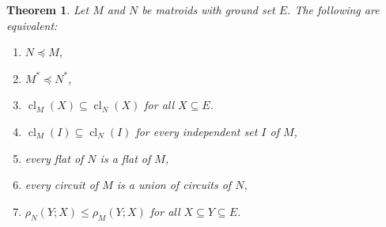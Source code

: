 \documentclass{amsart}
\theoremstyle{plain}
\newtheorem{theorem}{Theorem}[section]
\theoremstyle{definition}
\DeclareMathOperator{\cl}{cl}
\renewcommand{\le}{\leqslant}
\renewcommand{\ss}{\subseteq}
\newcommand{\relrank}[3]{\rho_{#1}({#2};{#3})}
\begin{document}
\begin{theorem}\label{quotequiv}
  Let $M$ and $N$ be matroids with ground set $E$. The following are equivalent: 
  \begin{enumerate}[(1)]
    \item\label{quot} $N \preceq M$,
    \item\label{quotdual} $M^* \preceq N^*$,
    \item\label{quotcl} $\cl_M(X) \subseteq \cl_N(X)$ for all $X \subseteq E$. 
    \item\label{quotclindep} $\cl_M(I) \subseteq \cl_N(I)$ for every independent set $I$ of $M$,
    \item\label{quotflat} every flat of $N$ is a flat of $M$,
    \item\label{quotcircuit} every circuit of $M$ is a union of circuits of $N$,
    \item\label{quotrank} $\relrank{N}{Y}{X} \le \relrank{M}{Y}{X}$ for all $X \ss Y \ss E$. 
  \end{enumerate}
\end{theorem}
\end{document}
